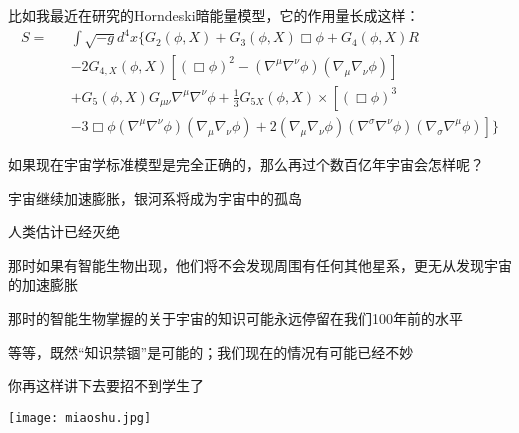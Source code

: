 \documentclass[CJK]{beamer}
\begin{document}
\begin{frame}

\bch
比如我最近在研究的Horndeski暗能量模型，它的作用量长成这样：
{\scriptsize
  \begin{eqnarray}
    S = && \int \sqrt{-g}d^4x \Big\{ G_2(\phi, X) + G_3(\phi, X)\Box\phi + G_4(\phi,X)R \nonumber \\
    && - 2G_{4,X}(\phi, X)\left[(\Box\phi)^2 - (\nabla^\mu\nabla^\nu\phi) (\nabla_\mu\nabla_\nu\phi)\right] \nonumber \\
    && + G_5(\phi, X)G_{\mu\nu}\nabla^\mu\nabla^\nu\phi +\frac{1}{3}G_{5X}(\phi, X)\times\left[(\Box\phi)^3 \right.\nonumber \\
    && \left.- 3 \Box\phi(\nabla^\mu\nabla^\nu\phi) (\nabla_\mu\nabla_\nu\phi) + 2(\nabla_\mu\nabla_\nu\phi)(\nabla^\sigma\nabla^\nu\phi) (\nabla_\sigma\nabla^\mu\phi)\right]\Big\}\nonumber
  \end{eqnarray}
}
\ech
\end{frame}


\begin{frame}
\bch
如果现在宇宙学标准模型是完全正确的，那么再过个数百亿年宇宙会怎样呢？

\bitem
\item{宇宙继续加速膨胀，银河系将成为宇宙中的孤岛}
\item{人类估计已经灭绝}
\item{那时如果有智能生物出现，他们将不会发现周围有任何其他星系，更无从发现宇宙的加速膨胀}
\item{那时的智能生物掌握的关于宇宙的知识可能永远停留在我们100年前的水平}
  \eitem
\ech
\end{frame}

\begin{frame}
\bch
等等，既然“知识禁锢”是可能的；我们现在的情况有可能已经不妙\wulian
\ech
\end{frame}


\begin{frame}
\bch
\skipline
\begin{minipage}{0.4\textwidth}

你再这样讲下去要招不到学生了
\vskip 2in
\ 
\end{minipage}
\texttt{[image: miaoshu.jpg]}
\ech
\end{frame}



\begin{frame}
\end{frame}
\end{document}

